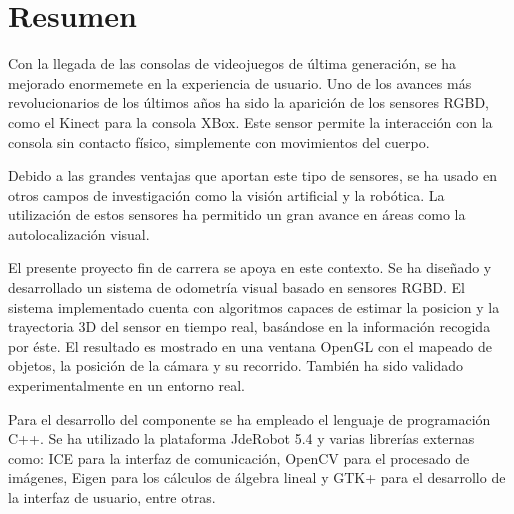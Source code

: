 \chapter*{Resumen}

Con la llegada de las consolas de videojuegos de última generación, se ha mejorado enormemete en la experiencia de usuario. Uno de los avances más revolucionarios de los últimos años ha sido la aparición de los sensores RGBD, como el Kinect para la consola XBox. Este sensor permite la interacción con la consola sin contacto físico, simplemente con movimientos del cuerpo.

Debido a las grandes ventajas que aportan este tipo de sensores, se ha usado en otros campos de investigación como la visión artificial y la robótica. La utilización de estos sensores ha permitido un gran avance en áreas como la autolocalización visual.

El presente proyecto fin de carrera se apoya en este contexto. Se ha diseñado y desarrollado un sistema de odometría visual basado en sensores RGBD. El sistema implementado cuenta con algoritmos capaces de estimar la posicion y la trayectoria 3D del sensor en tiempo real, basándose en la información recogida por éste. El resultado es mostrado en una ventana OpenGL con el mapeado de objetos, la posición de la cámara y su recorrido. También ha sido validado experimentalmente en un entorno real.

Para el desarrollo del componente se ha empleado el lenguaje de programación C++. Se ha utilizado la plataforma JdeRobot 5.4 y varias librerías externas como: ICE para la interfaz de comunicación, OpenCV para el procesado de imágenes, Eigen para los cálculos de álgebra lineal y GTK+ para el desarrollo de la interfaz de usuario, entre otras.